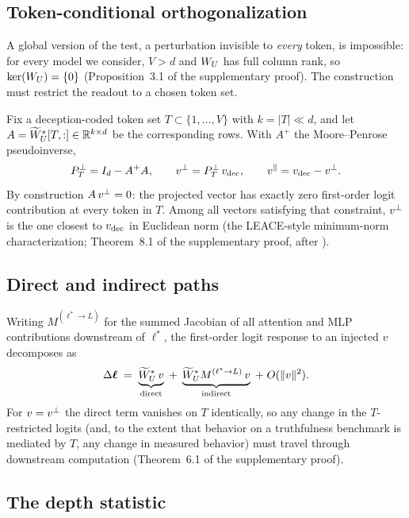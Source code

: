 \subsection{Token-conditional orthogonalization}

A global version of the test, a perturbation invisible to \emph{every} token, is impossible: for every model we consider, $V > d$ and $W_{U}$ has full column rank, so $\ker(W_{U}) = \{0\}$ (Proposition~3.1 of the supplementary proof). The construction must restrict the readout to a chosen token set.

Fix a deception-coded token set $T \subset \{1,\dots,V\}$ with $k = |T| \ll d$, and let $A = \widetilde{W}_{U}^{*}[T,:] \in \mathbb{R}^{k \times d}$ be the corresponding rows. With $A^{+}$ the Moore--Penrose pseudoinverse,
\begin{equation}
P_{T}^{\perp} = I_d - A^{+}A, \qquad v^{\perp} = P_{T}^{\perp}\,v_{\mathrm{dec}}, \qquad v^{\parallel} = v_{\mathrm{dec}} - v^{\perp} .
\label{eq:projection}
\end{equation}
By construction $A\,v^{\perp} = 0$: the projected vector has exactly zero first-order logit contribution at every token in $T$. Among all vectors satisfying that constraint, $v^{\perp}$ is the one closest to $v_{\mathrm{dec}}$ in Euclidean norm (the LEACE-style minimum-norm characterization; Theorem~8.1 of the supplementary proof, after \citealp{belrose2023leace}).

\subsection{Direct and indirect paths}

Writing $M^{(\ell^{*} \to L)}$ for the summed Jacobian of all attention and MLP contributions downstream of $\ell^{*}$, the first-order logit response to an injected $v$ decomposes as
\begin{equation}
\Delta\bm{\ell} \;=\; \underbrace{\widetilde{W}_{U}^{*}\, v}_{\text{direct}} \;+\; \underbrace{\widetilde{W}_{U}^{*} M^{(\ell^{*} \to L)}\, v}_{\text{indirect}} \;+\; O(\|v\|^2).
\label{eq:decomp}
\end{equation}
For $v = v^{\perp}$ the direct term vanishes on $T$ identically, so any change in the $T$-restricted logits (and, to the extent that behavior on a truthfulness benchmark is mediated by $T$, any change in measured behavior) must travel through downstream computation (Theorem~6.1 of the supplementary proof).

\subsection{The depth statistic}

